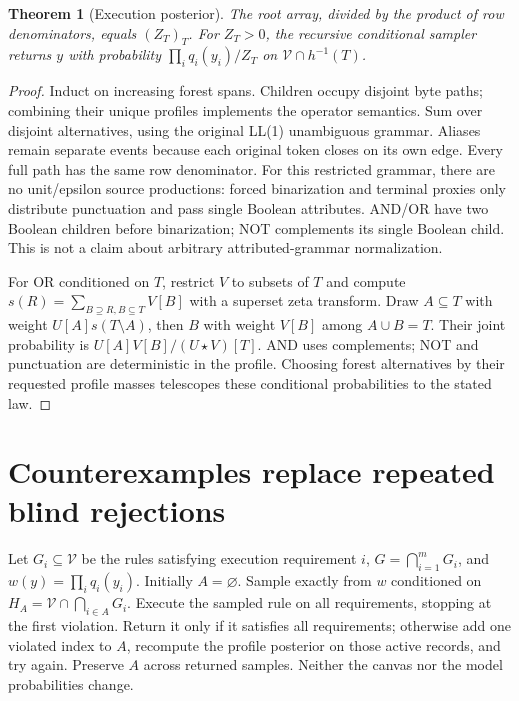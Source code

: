\documentclass[11pt,a4paper]{article}
\newtheorem{theorem}{Theorem}
\begin{document}
\begin{theorem}[Execution posterior]
The root array, divided by the product of row denominators, equals $(Z_T)_T$.
For $Z_T>0$, the recursive conditional sampler returns $y$ with probability
$\prod_iq_i(y_i)/Z_T$ on $\mathcal V\cap h^{-1}(T)$.
\end{theorem}
\begin{proof}
Induct on increasing forest spans. Children occupy disjoint byte paths;
combining their unique profiles implements the operator semantics. Sum over
disjoint alternatives, using the original LL(1) unambiguous grammar. Aliases
remain separate events because each original token closes on its own edge.
Every full path has the same row denominator. For this restricted grammar,
there are no unit/epsilon source productions: forced binarization and terminal
proxies only distribute punctuation and pass single Boolean attributes.
AND/OR have two Boolean children before binarization; NOT complements its
single Boolean child. This is not a claim about arbitrary attributed-grammar
normalization.

For OR conditioned on $T$, restrict $V$ to subsets of $T$ and compute
$s(R)=\sum_{B\supseteq R,B\subseteq T}V[B]$ with a superset zeta transform.
Draw $A\subseteq T$ with weight $U[A]s(T\setminus A)$, then $B$ with weight
$V[B]$ among $A\cup B=T$. Their joint probability is
$U[A]V[B]/(U\star V)[T]$. AND uses complements; NOT and punctuation are
deterministic in the profile. Choosing forest alternatives by their requested
profile masses telescopes these conditional probabilities to the stated law.
\end{proof}

\section{Counterexamples replace repeated blind rejections}
Let $G_i\subseteq\mathcal V$ be the rules satisfying execution requirement $i$,
$G=\bigcap_{i=1}^m G_i$, and $w(y)=\prod_iq_i(y_i)$. Initially $A=\varnothing$.
Sample exactly from $w$ conditioned on
$H_A=\mathcal V\cap\bigcap_{i\in A}G_i$. Execute the sampled rule on all
requirements, stopping at the first violation. Return it only if it satisfies
all requirements; otherwise add one violated index to $A$, recompute the
profile posterior on those active records, and try again. Preserve $A$ across
returned samples. Neither the canvas nor the model probabilities change.
\end{document}
